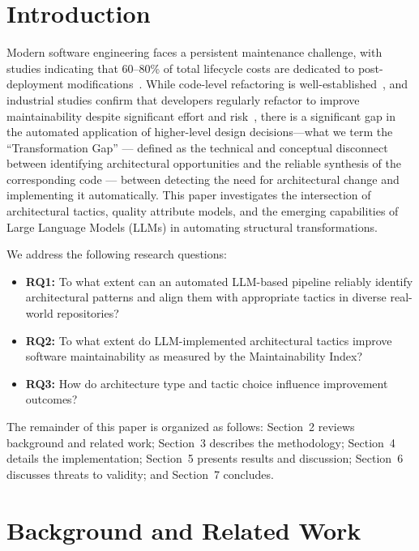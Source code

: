 \documentclass[sigconf,review,anonymous]{acmart}
\begin{document}
\section{Introduction}

Modern software engineering faces a persistent maintenance challenge, with studies indicating that 60--80\% of total lifecycle costs are dedicated to post-deployment modifications~\cite{bass2021software}. While code-level refactoring is well-established~\cite{fowler2018refactoring}, and industrial studies confirm that developers regularly refactor to improve maintainability despite significant effort and risk~\cite{kim2014refactoring}, there is a significant gap in the automated application of higher-level design decisions---what we term the ``Transformation Gap'' --- defined as the technical and conceptual disconnect between identifying architectural opportunities and the reliable synthesis of the corresponding code --- between detecting the need for architectural change and implementing it automatically. This paper investigates the intersection of architectural tactics, quality attribute models, and the emerging capabilities of Large Language Models (LLMs) in automating structural transformations.

We address the following research questions:
\begin{itemize}[nosep]
    \item \textbf{RQ1:} To what extent can an automated LLM-based pipeline reliably identify architectural patterns and align them with appropriate tactics in diverse real-world repositories?
    \item \textbf{RQ2:} To what extent do LLM-implemented architectural tactics improve software maintainability as measured by the Maintainability Index?
    \item \textbf{RQ3:} How do architecture type and tactic choice influence improvement outcomes?
\end{itemize}

The remainder of this paper is organized as follows: Section~2 reviews background and related work; Section~3 describes the methodology; Section~4 details the implementation; Section~5 presents results and discussion; Section~6 discusses threats to validity; and Section~7 concludes.

\section{Background and Related Work}
\end{document}
